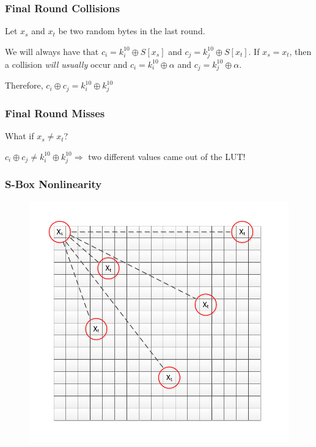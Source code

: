 \documentclass[9pt,handout]{beamer}
\begin{document}
\begin{frame}
	\frametitle{Final Round Collisions}
	Let $x_s$ and $x_t$ be two random bytes in the last round. 
	
	\bigskip
	
	We will always have that $c_i = k_i^{10} \oplus S[x_s]$ and $c_j = k_j^{10} \oplus S[x_t]$. If $x_s = x_t$, then a collision \emph{will usually} occur
	and $c_i = k_i^{10} \oplus \alpha$ and $c_j = k_j^{10} \oplus \alpha$.
	
	\bigskip

	Therefore, $c_i \oplus c_j = k_i^{10} \oplus k_j^{10}$
	
\end{frame}

\begin{frame}
	\frametitle{Final Round Misses}
	
	What if $x_s \not= x_t$?
	
	\bigskip 
	
	$c_i \oplus c_j \not= k_i^{10} \oplus k_j^{10} \Rightarrow$ two different values came out of the LUT!

\end{frame}

\begin{frame}
	\frametitle{S-Box Nonlinearity}
\begin{figure}
\centering
\includegraphics[scale = 0.6]{images/sboxLutDiff.pdf}
\end{figure}
\end{frame}
\end{document}
